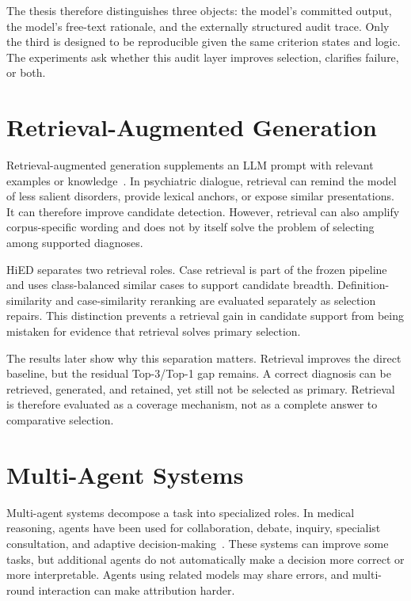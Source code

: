 The thesis therefore distinguishes three objects: the model's committed output, the model's free-text rationale, and the externally structured audit trace. Only the third is designed to be reproducible given the same criterion states and logic. The experiments ask whether this audit layer improves selection, clarifies failure, or both.

\section{Retrieval-Augmented Generation}

Retrieval-augmented generation supplements an LLM prompt with relevant examples or knowledge~\citep{lewis2020rag}. In psychiatric dialogue, retrieval can remind the model of less salient disorders, provide lexical anchors, or expose similar presentations. It can therefore improve candidate detection. However, retrieval can also amplify corpus-specific wording and does not by itself solve the problem of selecting among supported diagnoses.

HiED separates two retrieval roles. Case retrieval is part of the frozen pipeline and uses class-balanced similar cases to support candidate breadth. Definition-similarity and case-similarity reranking are evaluated separately as selection repairs. This distinction prevents a retrieval gain in candidate support from being mistaken for evidence that retrieval solves primary selection.

The results later show why this separation matters. Retrieval improves the direct baseline, but the residual Top-3/Top-1 gap remains. A correct diagnosis can be retrieved, generated, and retained, yet still not be selected as primary. Retrieval is therefore evaluated as a coverage mechanism, not as a complete answer to comparative selection.

\section{Multi-Agent Systems}

Multi-agent systems decompose a task into specialized roles. In medical reasoning, agents have been used for collaboration, debate, inquiry, specialist consultation, and adaptive decision-making~\citep{tang2024medagents,kim2024mdagents,wu2026wisemind}. These systems can improve some tasks, but additional agents do not automatically make a decision more correct or more interpretable. Agents using related models may share errors, and multi-round interaction can make attribution harder.


